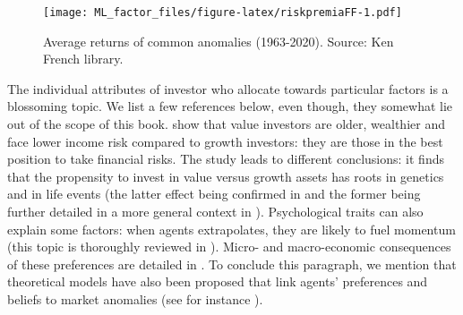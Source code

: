 \documentclass[]{krantz}
\makeatletter
\newenvironment{Shaded}{\begin{snugshade}}{\end{snugshade}}
\newcommand{\CommentTok}[1]{\textcolor[rgb]{0.37,0.37,0.37}{\textit{#1}}}
\newcommand{\DataTypeTok}[1]{\textcolor[rgb]{0.27,0.27,0.27}{#1}}
\newcommand{\DecValTok}[1]{\textcolor[rgb]{0.06,0.06,0.06}{#1}}
\newcommand{\KeywordTok}[1]{\textcolor[rgb]{0.27,0.27,0.27}{\textbf{#1}}}
\newcommand{\NormalTok}[1]{#1}
\newcommand{\OperatorTok}[1]{\textcolor[rgb]{0.43,0.43,0.43}{\textbf{#1}}}
\newcommand{\StringTok}[1]{\textcolor[rgb]{0.5,0.5,0.5}{#1}}
\newenvironment{kframe}{%
\medskip{}
\setlength{\fboxsep}{.8em}
 \def\at@end@of@kframe{}%
 \ifinner\ifhmode%
  \def\at@end@of@kframe{\end{minipage}}%
  \begin{minipage}{\columnwidth}%
 \fi\fi%
 \def\FrameCommand##1{\hskip\@totalleftmargin \hskip-\fboxsep
 \colorbox{shadecolor}{##1}\hskip-\fboxsep
     \hskip-\linewidth \hskip-\@totalleftmargin \hskip\columnwidth}%
 \MakeFramed {\advance\hsize-\width
   \@totalleftmargin\z@ \linewidth\hsize
   \@setminipage}}%
 {\par\unskip\endMakeFramed%
 \at@end@of@kframe}
\renewenvironment{Shaded}{\begin{kframe}}{\end{kframe}}
\theoremstyle{definition}
\theoremstyle{definition}
\theoremstyle{definition}
\theoremstyle{remark}
\makeatother
\begin{document}
\begin{Shaded}
\end{Shaded}

\begin{figure}
\centering
\texttt{[image: ML\_factor\_files/figure-latex/riskpremiaFF-1.pdf]}
\caption{\label{fig:riskpremiaFF}Average returns of common anomalies
(1963-2020). Source: Ken French library.}
\end{figure}

\normalsize

The individual attributes of investor who allocate towards particular
factors is a blossoming topic. We list a few references below, even
though, they somewhat lie out of the scope of this book.
\citet{betermier2017value} show that value investors are older,
wealthier and face lower income risk compared to growth investors: they
are those in the best position to take financial risks. The study
\citet{cronqvist2015value} leads to different conclusions: it finds that
the propensity to invest in value versus growth assets has roots in
genetics and in life events (the latter effect being confirmed in
\citet{cocco2019evidence} and the former being further detailed in a
more general context in \citet{cronqvist2015fetal}). Psychological
traits can also explain some factors: when agents extrapolates, they are
likely to fuel momentum (this topic is thoroughly reviewed in
\citet{barberis2018psychology}). Micro- and macro-economic consequences
of these preferences are detailed in \citet{bhamra2019does}. To conclude
this paragraph, we mention that theoretical models have also been
proposed that link agents' preferences and beliefs to market anomalies
(see for instance \citet{barberis2019prospect}).
\end{document}
